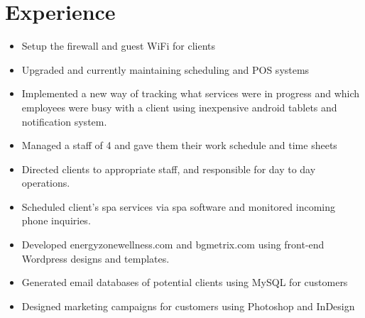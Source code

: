 \documentclass[12pt,letterpaper,sans]{moderncv}        %
\begin{document}
\section{Experience}
{\begin{itemize}%
\item Setup the firewall and guest WiFi for clients
\item Upgraded and currently maintaining scheduling and POS systems
\item Implemented a new way of tracking what services were in progress and which employees were busy with a client using inexpensive android tablets and notification system.
\end{itemize}}
{\begin{itemize}%
\item Managed a staff of 4 and gave them their work schedule and time sheets
\item Directed clients to appropriate staff, and responsible for day to day operations.
\item Scheduled client’s spa services via spa software and monitored incoming phone inquiries.
\end{itemize} }
{\begin{itemize}%
\item Developed energyzonewellness.com and bgmetrix.com using front-end Wordpress designs and templates.
\item Generated email databases of potential clients using MySQL for customers
\item Designed marketing campaigns for customers using Photoshop and InDesign
\end{itemize}
  }
\end{document}
